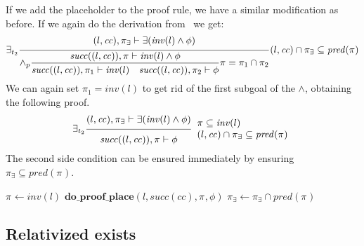 \documentclass{article}
\newcommand{\proofrule}[3][]{#1 \frac{\raisebox{.7ex}{\normalsize{$#2$}}}
  {\raisebox{-1.0ex}{\normalsize{$#3$}}}}
\newcommand{\placeholder}[1][]{\pi_{#1}}
\newcommand{\loc}{l}
\newcommand{\region}{\mathit{cc}}
\newcommand{\suc}{\mathit{succ}}
\newcommand{\pre}{\mathit{pred}}
\newcommand{\inv}{\mathit{inv}}
\newcommand{\method}[1]{\ensuremath{\mathbf{#1}}}
\begin{document}
If we add the placeholder to the proof rule, we have a similar modification as
before. If we again do the derivation from~\cite[Appendix C.2]{FC:14report} we get:
\[
\proofrule[\exists_{t_2}]
{(\loc, \region), \placeholder[\exists] \vdash \exists(\inv(\loc) \land \phi)}
{\proofrule[\land_p]
  {\suc((\loc, \region)), \placeholder \vdash \inv(\loc) \land \phi}
  {\suc((\loc, \region)), \placeholder[1] \vdash \inv(\loc)
   \quad \suc((\loc, \region)), \placeholder[2] \vdash \phi}
  \placeholder = \placeholder[1] \cap \placeholder[2]
}
(\loc, \region) \cap \placeholder[\exists] \subseteq \pre(\placeholder)
\]
We can again set $\placeholder[1] = \inv(\loc)$ to get rid of the first subgoal of the $\land$,
obtaining the following proof.
\[
\proofrule[\exists_{t_2}]
{(\loc, \region), \placeholder[\exists] \vdash \exists(\inv(\loc) \land \phi)}
{\suc((\loc, \region)), \placeholder \vdash \phi}
\begin{array}{l}
\placeholder \subseteq \inv(l)\\
(\loc, \region) \cap \placeholder[\exists] \subseteq \pre(\placeholder)
\end{array}
\]
The second side condition can be ensured immediately by ensuring $\placeholder[\exists] \subseteq \pre(\placeholder)$.

\begin{algorithm}[H]
\caption{$\method{do\_proof\_exists\_place}(\loc, \region, \placeholder[\exists], \exists(\phi))$}
\begin{algorithmic}
\STATE $\placeholder \gets \inv(\loc)$ 
\STATE $\method{do\_proof\_place}(\loc, \suc(\region), \placeholder, \phi)$
\STATE $\placeholder[\exists] \gets \placeholder[\exists] \cap \pre(\placeholder)$
\end{algorithmic}
\end{algorithm}


\subsection{Relativized exists}
\end{document}
